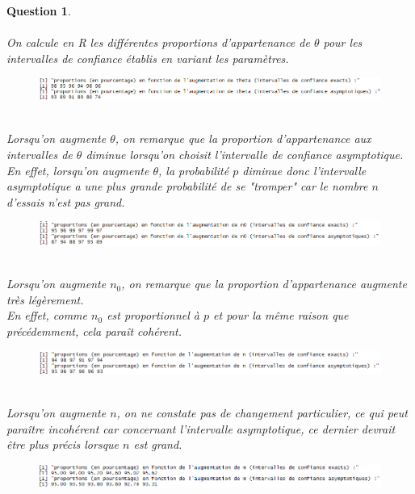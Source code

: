 \documentclass[a4paper,11pt]{article}
\newtheorem{exo4}{Question}
\begin{document}
\begin{exo4} \ \\ \\
On calcule en R les différentes proportions d'appartenance de $\theta$ pour les intervalles de confiance établis en variant les paramètres.
\begin{figure}[h]
\includegraphics[scale=0.85]{images/Q4_1_theta.PNG}
\end{figure} \ \\
Lorsqu'on augmente $\theta$, on remarque que la proportion d'appartenance aux intervalles de $\theta$ diminue lorsqu'on choisit l'intervalle de confiance asymptotique. \ \\
En effet, lorsqu'on augmente $\theta$, la probabilité $p$ diminue donc l'intervalle asymptotique a une plus grande probabilité de se "tromper" car le nombre $n$ d'essais n'est pas grand.
\begin{figure}[h]
\includegraphics[scale=0.85]{images/Q4_1_n0.PNG}
\end{figure} \ \\
Lorsqu'on augmente $n_{0}$, on remarque que la proportion d'appartenance augmente très légèrement. \ \\
En effet, comme $n_{0}$ est proportionnel à $p$ et pour la même raison que précédemment, cela paraît cohérent.
\begin{figure}[h]
\includegraphics[scale=0.85]{images/Q4_1_n.PNG}
\end{figure} \ \\
Lorsqu'on augmente $n$, on ne constate pas de changement particulier, ce qui peut paraître incohérent car concernant l'intervalle asymptotique, ce dernier devrait être plus précis lorsque $n$ est grand.
\newpage
\begin{figure}[h]
\includegraphics[scale=0.85]{images/Q4_1_m.PNG}
\end{figure} \ \\

\end{exo4}
\end{document}
